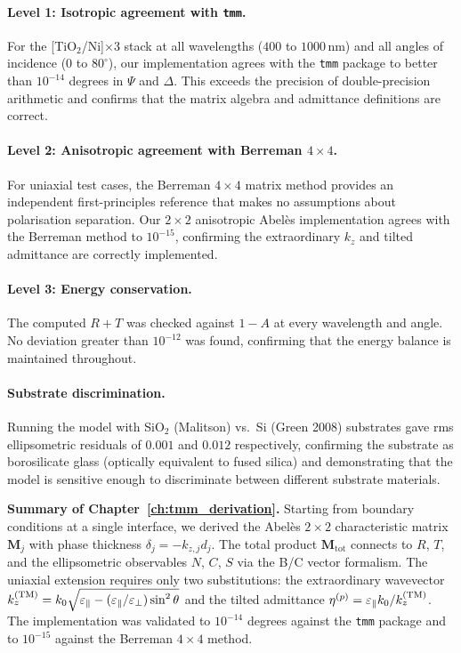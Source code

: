 \paragraph{Level 1: Isotropic agreement with \texttt{tmm}.}
For the [TiO$_2$/Ni]$\times$3 stack at all wavelengths ($400$ to $1000$\,nm)
and all angles of incidence ($0$ to $80^\circ$), our implementation agrees
with the \texttt{tmm} package to better than $10^{-14}$ degrees in $\Psi$
and $\Delta$. This exceeds the precision of double-precision arithmetic and
confirms that the matrix algebra and admittance definitions are correct.

\paragraph{Level 2: Anisotropic agreement with Berreman $4\times 4$.}
For uniaxial test cases, the Berreman $4\times 4$ matrix method provides an
independent first-principles reference that makes no assumptions about
polarisation separation. Our $2\times 2$ anisotropic Abelès implementation
agrees with the Berreman method to $10^{-15}$, confirming the extraordinary
$k_z$ and tilted admittance are correctly implemented.

\paragraph{Level 3: Energy conservation.}
The computed $R + T$ was checked against $1 - A$ at every wavelength and
angle. No deviation greater than $10^{-12}$ was found, confirming that the
energy balance is maintained throughout.

\paragraph{Substrate discrimination.}
Running the model with SiO$_2$ (Malitson) vs.~Si (Green 2008) substrates
gave rms ellipsometric residuals of $0.001$ and $0.012$ respectively,
confirming the substrate as borosilicate glass (optically equivalent to
fused silica) and demonstrating that the model is sensitive enough to
discriminate between different substrate materials.

\begin{resultbox}
\textbf{Summary of Chapter~\ref{ch:tmm_derivation}.} Starting from boundary
conditions at a single interface, we derived the Abelès $2\times 2$
characteristic matrix $\bm{M}_j$ with phase thickness $\delta_j = -k_{z,j}d_j$.
The total product $\bm{M}_\text{tot}$ connects to $R$, $T$, and the
ellipsometric observables $N$, $C$, $S$ via the B/C vector formalism.
The uniaxial extension requires only two substitutions: the extraordinary
wavevector $k_z^{(\mathrm{TM})} = k_0\sqrt{\varepsilon_{\parallel} - (\varepsilon_{\parallel}/\varepsilon_{\perp})\sin^2\theta}$
and the tilted admittance $\eta^{(p)} = \varepsilon_{\parallel} k_0/k_z^{(\mathrm{TM})}$.
The implementation was validated to $10^{-14}$ degrees against the
\texttt{tmm} package and to $10^{-15}$ against the Berreman $4\times 4$
method.
\end{resultbox}
